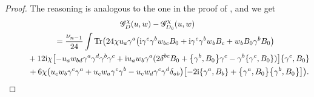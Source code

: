 \documentclass[pdftex]{sigma}
\numberwithin{equation}{section}
\theoremstyle{definition}
\begin{document}
\begin{proof}
 The reasoning is analogous to the one in the proof of \cite[Proposition~II.1.]{bochniak2025}, and we get
\begin{gather*}%
				\mathscr{G}_D^\chi(u,w)-\mathscr{G}_{D_0}^\chi(u,w) \\
			\qquad=\frac{\nu_{n-1}}{24}\int\operatorname{Tr}\bigl(24\chi u_a\gamma^a\bigl( {\rm i}\gamma^c\gamma^bw_{bc}B_0 + {\rm i} \gamma^c\gamma^bw_bB_c+w_bB_0\gamma^bB_0\bigr)\nonumber\\
			 \phantom{\qquad=}{} +12 {\rm i} \chi\bigl[-u_aw_{bd}\gamma^a\gamma^d\gamma^b\gamma^c
			 + {\rm i}u_aw_b\gamma^a(2\delta^{bc}B_0
			 + \bigl\{\gamma^b,B_0\bigr\}\gamma^c - \gamma^b\{\gamma^c,B_0\})\bigr]\{\gamma^c,B_0\}\\
			 \phantom{\qquad=}{} +6\chi\bigl(u_cw_b\gamma^c\gamma^a + u_cw_a\gamma^c\gamma^b
			 - u_cw_d\gamma^c\gamma^d\delta_{ab}\bigr)\bigl[-2 {\rm i}\{\gamma^a,B_b\} + \bigl\{\gamma^a,B_0\bigr\}\bigl\{\gamma^b,B_0\bigr\}\bigr]\bigr).
		\end{gather*}
	

\end{proof}
\end{document}
